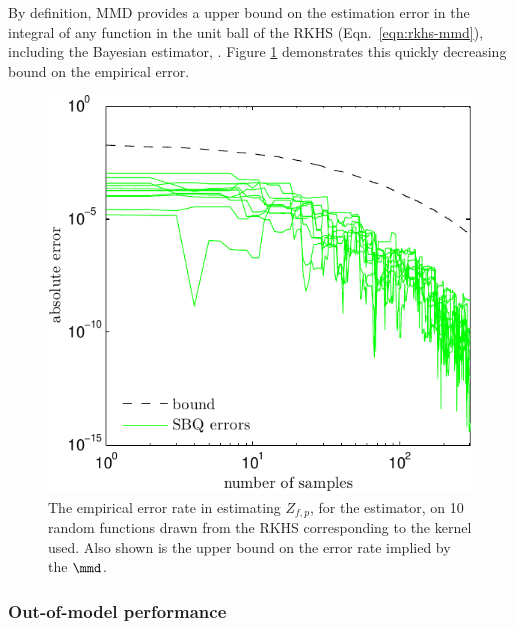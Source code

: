 By definition, MMD provides a upper bound on the estimation error in the integral of any function in the unit ball of the RKHS (Eqn.\ \eqref{eqn:rkhs-mmd}), including the Bayesian estimator, \sbq{}. Figure \ref{fig:bound_curve} demonstrates this quickly decreasing bound on the \sbq{} empirical error.

\begin{figure}
\includegraphics[width=\columnwidth]{figs/herding/bound_curve_rkhs}
\caption{The empirical error rate in estimating $Z_{f,p}$,  for the \sbq{} estimator, on 10 random functions drawn from the RKHS corresponding to the kernel used.  Also shown is the upper bound on the error rate implied by the $\mmd$.}
\label{fig:bound_curve}
\end{figure}

\subsubsection{Out-of-model performance}

